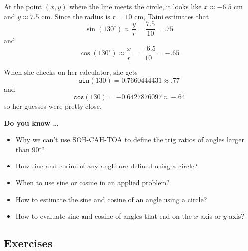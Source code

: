 \begin{center}
\end{center}

At the point $(x,y)$ where the line meets the circle, 
it looks like $x \approx -6.5\text{ cm}$ and $y \approx 7.5 \text{ cm}$.  Since the radius is $r = 10 \text{ cm}$, Taini estimates that
$$\sin(130^\circ) \approx \frac{y}{r} = \frac{7.5}{10}=.75$$
and 
$$\cos(130^\circ) \approx \frac{x}{r} = \frac{-6.5}{10}=-.65$$

When she checks on her calculator, she gets
$$\boxed{\texttt{sin}}(130)= 0.7660444431 \approx .77$$
and 
$$\boxed{\texttt{cos}}(130)= -0.6427876097 \approx -.64$$
so her guesses were pretty close.

 

\noindent \textbf{Do you know \ldots}

\begin{itemize}
\item Why we can't use SOH-CAH-TOA to define the trig ratios of angles larger than 90$^\circ$?
\item How sine and cosine of any angle are defined using a circle?
\item When to use sine or cosine in an applied problem?
\item How to estimate the sine and cosine of an angle using a circle?
\item How to evaluate sine and cosine of angles that end on the $x$-axis or $y$-axis?
 
  
\end{itemize}

\subsection*{Exercises}

